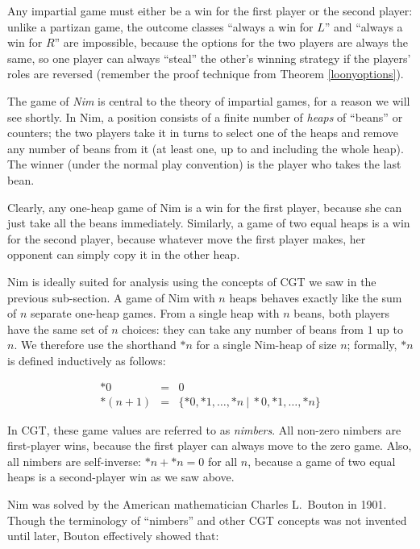 \documentclass[a4paper,twocolumn]{article}
\newcommand{\cgtgame}[2]{\{#1 \:|\: #2\}}
\begin{document}
Any impartial game must either be a win for the first player or the
second player: unlike a partizan game, the outcome classes ``always a
win for $L$'' and ``always a win for $R$'' are impossible, because the
options for the two players are always the same, so one player can
always ``steal'' the other's winning strategy if the players' roles
are reversed (remember the proof technique from Theorem
\ref{loonyoptions}).

The game of \emph{Nim} is central to the theory of impartial games,
for a reason we will see shortly. In Nim, a position consists of a
finite number of \emph{heaps} of ``beans'' or counters; the two
players take it in turns to select one of the heaps and remove any
number of beans from it (at least one, up to and including the whole
heap). The winner (under the normal play convention) is the player who
takes the last bean.

Clearly, any one-heap game of Nim is a win for the first player,
because she can just take all the beans immediately. Similarly, a game
of two equal heaps is a win for the second player, because whatever
move the first player makes, her opponent can simply copy it in the
other heap.

Nim is ideally suited for analysis using the concepts of CGT we saw in
the previous sub-section. A game of Nim with $n$ heaps behaves exactly
like the sum of $n$ separate one-heap games. From a single heap with
$n$ beans, both players have the same set of $n$ choices: they can
take any number of beans from $1$ up to $n$. We therefore use the
shorthand $*n$ for a single Nim-heap of size $n$; formally, $*n$ is
defined inductively as follows:

\begin{eqnarray*}
  *0 & = & 0 \\
  *(n+1) & = & \cgtgame{*0, *1, \ldots, *n}{*0, *1, \ldots, *n}
\end{eqnarray*}

In CGT, these game values are referred to as \emph{nimbers}. All
non-zero nimbers are first-player wins, because the first player can
always move to the zero game. Also, all nimbers are self-inverse: $*n
+ *n = 0$ for all $n$, because a game of two equal heaps is a
second-player win as we saw above.

Nim was solved by the American mathematician Charles L.\ Bouton in
1901. Though the terminology of ``nimbers'' and other CGT concepts was
not invented until later, Bouton effectively showed that:
\end{document}
